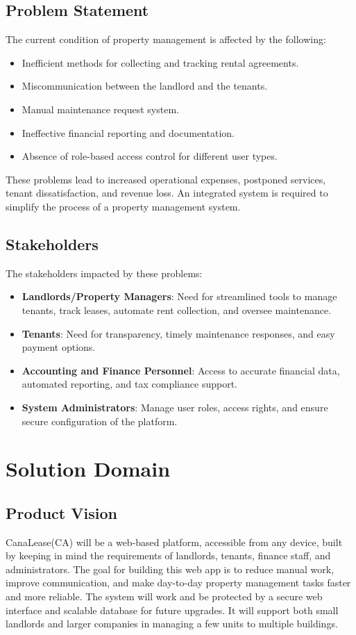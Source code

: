 \documentclass[12pt]{article}
\begin{document}
\subsection{Problem Statement}
The current condition of property management is affected by the following:
\begin{itemize}
    \item Inefficient methods for collecting and tracking rental agreements.
    \item Miscommunication between the landlord and the tenants.
    \item Manual maintenance request system.
    \item Ineffective financial reporting and documentation.
    \item Absence of role-based access control for different user types.

\end{itemize}
These problems lead to increased operational expenses, postponed services, tenant dissatisfaction, and revenue loss. An integrated system is required to simplify the process of a property management system.

\subsection{Stakeholders}
The stakeholders impacted by these problems:

\begin{itemize}
    \item \textbf{Landlords/Property Managers}: Need for streamlined tools to manage tenants, track leases, automate rent collection, and oversee maintenance.
    \item \textbf{Tenants}: Need for transparency, timely maintenance responses, and easy payment options.
    \item \textbf{Accounting and Finance Personnel}: Access to accurate financial data, automated reporting, and tax compliance support.
    \item \textbf{System Administrators}: Manage user roles, access rights, and ensure secure configuration of the platform.
\end{itemize}

\section{Solution Domain}

\subsection{Product Vision}
CanaLease(CA) will be a web-based platform, accessible from any device, built by keeping in mind the requirements of landlords, tenants, finance staff, and administrators. The goal for building this web app is to reduce manual work, improve communication, and make day-to-day property management tasks faster and more reliable. The system will work and be protected by a secure web interface and scalable database for future upgrades. It will support both small landlords and larger companies in managing a few units to multiple buildings.  
\end{document}
